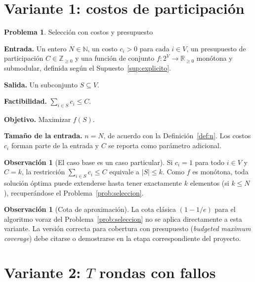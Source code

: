 \documentclass[11pt,a4paper]{article}
\theoremstyle{definition}
\newtheorem{problema}[definicion]{Problema}
\newtheorem{observacion}[definicion]{Observación}
\theoremstyle{plain}
\newcommand{\N}{\mathbb{N}}
\newcommand{\Z}{\mathbb{Z}}
\newcommand{\R}{\mathbb{R}}
\begin{document}
\section{Variante 1: costos de participación}

\begin{problema}\label{prob:costos} Selección con costos y presupuesto

\textbf{Entrada.} Un entero $N\in\N$, un costo $c_i>0$ para cada $i\in V$, un
presupuesto de participación $C\in\Z_{\ge0}$ y una función de conjunto
$f:2^V\to\R_{\ge0}$ monótona y submodular, definida según el
Supuesto~\ref{sup:explicito}.

\textbf{Salida.} Un subconjunto $S\subseteq V$.

\textbf{Factibilidad.} $\sum_{i\in S} c_i\le C$.

\textbf{Objetivo.} Maximizar $f(S)$.

\textbf{Tamaño de la entrada.} $n=N$, de acuerdo con la
Definición~\ref{def:n}. Los costos $c_i$ forman parte de la entrada y $C$ se
reporta como parámetro adicional.
\end{problema}

\begin{observacion}[El caso base es un caso particular]
Si $c_i=1$ para todo $i\in V$ y $C=k$, la restricción
$\sum_{i\in S} c_i\le C$ equivale a $|S|\le k$. Como $f$ es monótona, toda
solución óptima puede extenderse hasta tener exactamente $k$ elementos (si
$k\le N$), recuperándose el Problema~\ref{prob:seleccion}.
\end{observacion}

\begin{observacion}[Cota de aproximación]
La cota clásica $(1-1/e)$ para el algoritmo voraz del Problema~\ref{prob:seleccion}
no se aplica directamente a esta variante. La versión correcta para cobertura
con presupuesto (\emph{budgeted maximum coverage}) debe citarse o demostrarse
en la etapa correspondiente del proyecto.
\end{observacion}

\section{Variante 2: $T$ rondas con fallos}
\end{document}
